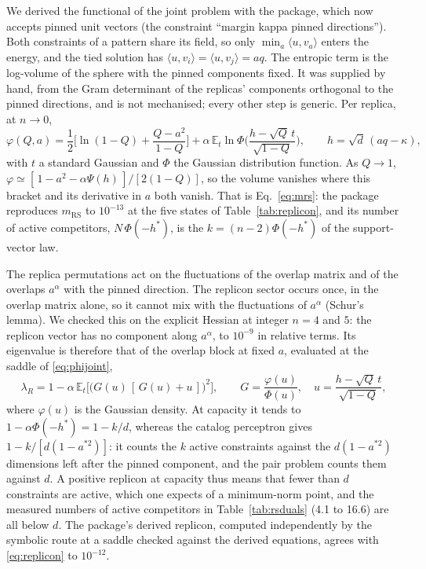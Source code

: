 We derived the functional of the joint problem with the package, which now accepts pinned unit vectors (the constraint ``margin kappa pinned directions''). Both constraints of a pattern share its field, so only $\min_a\langle u,v_a\rangle$ enters the energy, and the tied solution has $\langle u,v_i\rangle=\langle u,v_j\rangle=aq$. The entropic term is the log-volume of the sphere with the pinned components fixed. It was supplied by hand, from the Gram determinant of the replicas' components orthogonal to the pinned directions, and is not mechanised; every other step is generic. Per replica, at $n\to0$,
\begin{equation}
\varphi(Q,a)=\frac12\Big[\ln(1-Q)+\frac{Q-a^2}{1-Q}\Big]+\alpha\,\mathbb{E}_t\ln\Phi\!\Big(\frac{h-\sqrt{Q}\,t}{\sqrt{1-Q}}\Big),\qquad h=\sqrt d\,(aq-\kappa),
\label{eq:phijoint}
\end{equation}
with $t$ a standard Gaussian and $\Phi$ the Gaussian distribution function. As $Q\to1$, $\varphi\simeq[\,1-a^2-\alpha\Psi(h)\,]/[2(1-Q)]$, so the volume vanishes where this bracket and its derivative in $a$ both vanish. That is Eq.~\eqref{eq:mrs}: the package reproduces $m_{\mathrm{RS}}$ to $10^{-13}$ at the five states of Table~\ref{tab:replicon}, and its number of active competitors, $N\,\Phi(-h^*)$, is the $k=(n-2)\Phi(-h^*)$ of the support-vector law.

The replica permutations act on the fluctuations of the overlap matrix and of the overlaps $a^\alpha$ with the pinned direction. The replicon sector occurs once, in the overlap matrix alone, so it cannot mix with the fluctuations of $a^\alpha$ (Schur's lemma). We checked this on the explicit Hessian at integer $n=4$ and $5$: the replicon vector has no component along $a^\alpha$, to $10^{-9}$ in relative terms. Its eigenvalue is therefore that of the overlap block at fixed $a$, evaluated at the saddle of \eqref{eq:phijoint},
\begin{equation}
\lambda_R=1-\alpha\,\mathbb{E}_t\Big[\big(G(u)\,[\,G(u)+u\,]\big)^2\Big],\qquad G=\frac{\varphi(u)}{\Phi(u)},\quad u=\frac{h-\sqrt{Q}\,t}{\sqrt{1-Q}},
\label{eq:replicon}
\end{equation}
where $\varphi(u)$ is the Gaussian density. At capacity it tends to $1-\alpha\Phi(-h^*)=1-k/d$, whereas the catalog perceptron gives $1-k/[d(1-a^{*2})]$: it counts the $k$ active constraints against the $d(1-a^{*2})$ dimensions left after the pinned component, and the pair problem counts them against $d$. A positive replicon at capacity thus means that fewer than $d$ constraints are active, which one expects of a minimum-norm point, and the measured numbers of active competitors in Table~\ref{tab:rsduals} (4.1 to 16.6) are all below $d$. The package's derived replicon, computed independently by the symbolic route at a saddle checked against the derived equations, agrees with \eqref{eq:replicon} to $10^{-12}$.

